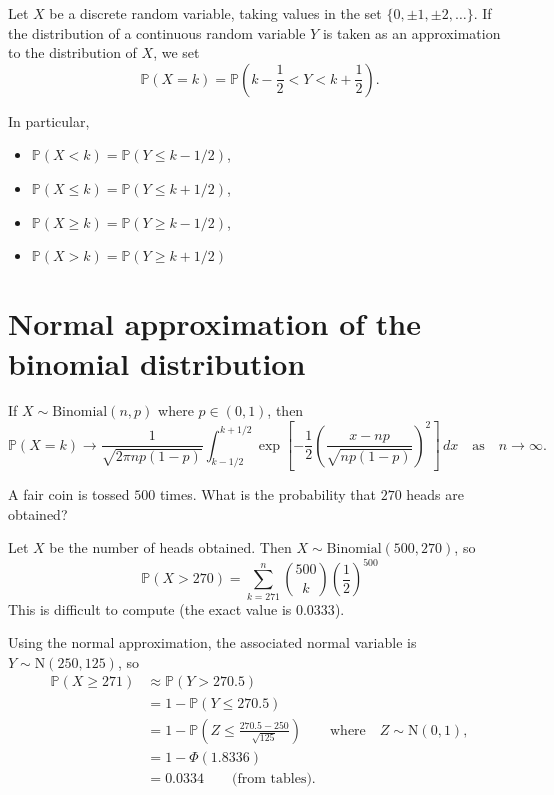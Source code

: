 \documentclass[lecture]{csm}
\newcommand{\prob}{\mathbb{P}}
\def\it{\item}
\def\bit{\begin{itemize}}
\def\eit{\end{itemize}}
\newcommand{\lt}{<}
\newcommand{\gt}{>}
\newcommand{\proofomitted}{\par[\textit{Proof omitted.}]\par}
\begin{document}
\begin{definition}
Let $X$ be a discrete random variable, taking values in the set $\{0,\pm 1,\pm 2,\ldots\}$. If the distribution of a continuous random variable $Y$ is taken as an approximation to the distribution of $X$, we set
\[
\prob(X=k) = \prob\left(k - \frac{1}{2} < Y < k + \frac{1}{2}\right).
\] 
\end{definition}

In particular,
\bit
\it $\prob(X\lt  k) = \prob(Y\leq k-1/2)$, 
\it $\prob(X\leq k) = \prob(Y\leq k+1/2)$,
\it $\prob(X\geq k) = \prob(Y\geq k-1/2)$,
\it $\prob(X\gt  k) = \prob(Y\geq k+1/2)$
\eit

\newpage
\section{Normal approximation of the binomial distribution}

\begin{theorem}
If $X\sim\text{Binomial}(n,p)$ where $p\in(0,1)$, then
\[
\prob(X=k)\to \frac{1}{\sqrt{2\pi np(1-p)}}\int_{k-1/2}^{k+1/2} \exp\left[-\frac{1}{2}\left(\frac{x-np}{\sqrt{np(1-p)}}\right)^2\right]\,dx 
\quad\text{as}\quad n\to\infty.
\]
\end{theorem}
\proofomitted

\newpage

\begin{example}
A fair coin is tossed $500$ times. What is the probability that $270$ heads are obtained?
\end{example}

\begin{solution}
Let $X$ be the number of heads obtained. Then $X\sim\text{Binomial}(500,270)$, so 
\[
\prob(X > 270) = \sum_{k=271}^{n}\binom{500}{k}\left(\frac{1}{2}\right)^{500}
\]
This is difficult to compute (the exact value is $0.0333$).

Using the normal approximation, the associated normal variable is $Y\sim\text{N}(250,125)$, so
\begin{align*}
\prob(X\geq 271)
	& \approx\prob(Y > 270.5) \\
	& = 1 - \prob(Y \leq 270.5) \\
	& = 1 - \prob\left(Z \leq \frac{270.5 - 250}{\sqrt{125}}\right) \qquad\text{where}\quad Z\sim\text{N}(0,1), \\
	& = 1 - \Phi(1.8336) \\
	& = 0.0334 \qquad\text{(from tables)}.
\end{align*}
\end{solution}
\end{document}

